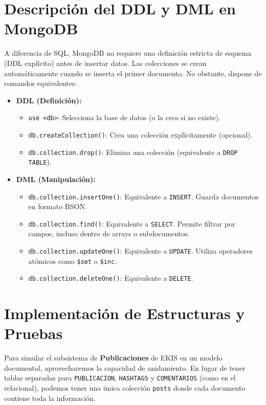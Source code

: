 \section{Descripción del DDL y DML en MongoDB}
A diferencia de SQL, MongoDB no requiere una definición estricta de esquema (DDL explícito) antes de insertar datos. Las colecciones se crean automáticamente cuando se inserta el primer documento. No obstante, dispone de comandos equivalentes:

\begin{itemize}
    \item \textbf{DDL (Definición):}
    \begin{itemize}
        \item \texttt{use <db>}: Selecciona la base de datos (o la crea si no existe).
        \item \texttt{db.createCollection()}: Crea una colección explícitamente (opcional).
        \item \texttt{db.collection.drop()}: Elimina una colección (equivalente a \texttt{DROP TABLE}).
    \end{itemize}
    \item \textbf{DML (Manipulación):}
    \begin{itemize}
        \item \texttt{db.collection.insertOne()}: Equivalente a \texttt{INSERT}. Guarda documentos en formato BSON.
        \item \texttt{db.collection.find()}: Equivalente a \texttt{SELECT}. Permite filtrar por campos, incluso dentro de arrays o subdocumentos.
        \item \texttt{db.collection.updateOne()}: Equivalente a \texttt{UPDATE}. Utiliza operadores atómicos como \texttt{\$set} o \texttt{\$inc}.
        \item \texttt{db.collection.deleteOne()}: Equivalente a \texttt{DELETE}.
    \end{itemize}
\end{itemize}

\section{Implementación de Estructuras y Pruebas}
Para simular el subsistema de \textbf{Publicaciones} de EKIS en un modelo documental, aprovecharemos la capacidad de anidamiento. En lugar de tener tablas separadas para \texttt{PUBLICACION}, \texttt{HASHTAGS} y \texttt{COMENTARIOS} (como en el relacional), podemos tener una única colección \texttt{posts} donde cada documento contiene toda la información.

